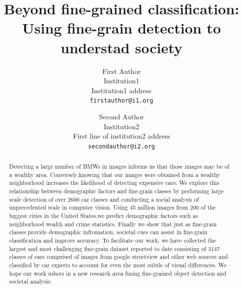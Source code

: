 \documentclass[10pt,twocolumn,letterpaper]{article}
\begin{document}
\title{Beyond fine-grained classification: Using fine-grain detection to understad society}

\author{First Author\\
Institution1\\
Institution1 address\\
{\tt\small firstauthor@i1.org}
\and
Second Author\\
Institution2\\
First line of institution2 address\\
{\tt\small secondauthor@i2.org}
}

\maketitle

\begin{abstract}
Detecting a large number of BMWs in images informs us that those images may be of a wealthy area. Conversely,knowing that our images were obtained from a wealthy neighborhood increases the likelihood of detecting expensive cars. We explore this relationship between demographic factors and fine-grain classes by performing large scale detection of over 2600 car classes and conducting a social analysis of unprecedented scale in computer vision. Using 45 million images from 200 of the biggest cities in the United States,we predict demographic factors such as neighborhood wealth and crime statistics. Finally we show that just as fine-grain classes provide demographic infromation, societal cues can assist in fine-grain classification and improve accuracy. To facilitate our work, we have collected the largest and most challenging fine-grain dataset reported to date consisting of 3147 classes of cars comprised of images from google streetview and other web sources and classified by car experts to account for even the most subtle of visual differences. We hope our work ushers in a new research area fusing fine-grained object detection and societal analysis.
\end{abstract}
\end{document}
